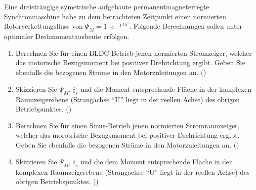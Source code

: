 \begin{question}[topic=psm,type=exam,tags={20130624}]
Eine dreisträngige symetrische aufgebaute permanentmagneterregte Synchronmaschine habe zu dem betrachteten Zeitpunkt einen normierten Rotorverkettungsfluss von $\underline{\Psi}_M = 1 \cdot e^{-\jmath15^\circ}$. Folgende Berechnungen sollen unter optimaler Drehmomentausbeute erfolgen.
\begin{enumerate}
\item Berechnen Sie für einen BLDC-Betrieb jenen normierten Stromzeiger, welcher das motorische Bezugsmoment bei positiver Drehrichtung ergibt. Geben Sie ebenfalls die bezogenen Ströme in den Motorzuleitungen an. ()
\item Skizzieren Sie $\underline{\Psi}_M$, $\underline{i}_s$ und die Moment entsprechende Fläche in der komplexen Raumzeigerebene (Strangachse ``U'' liegt in der reellen Achse) des obrigen Betriebpunktes. ()
\item Berechnen Sie für einen Sinus-Betrieb jenen normierten Stromraumzeiger, welcher das morotrische Bezugsmoment bei positiver Drehrichtung ergibt. Geben Sie ebenfalls die bezogenen Ströme in den Motorzuleitungen an. ()
\item Skizzieren Sie $\underline{\Psi}_M$, $\underline{i}_s$ und die dem Moment entsprechende Fläche in der komplexen Raumzeigerebene (Strangachse ``U'' liegt in der reellen Achse) des obrigen Betriebspunktes. ()
\end{enumerate}
\end{question}
